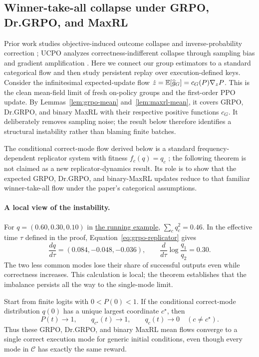 \subsection{Winner-take-all collapse under GRPO, Dr.GRPO, and MaxRL}
\label{app:theory-collapse}

Prior work studies objective-induced outcome collapse and inverse-probability
correction \citep{sinha2026expected}; UCPO analyzes correctness-indifferent collapse
through sampling bias and gradient amplification \citep[Section~4]{lochab2026ucpo}.
Here we connect our group estimators to a standard categorical flow and then study
persistent replay over execution-defined keys.
Consider the infinitesimal expected-update flow
$\dot z=\mathbb E[\widehat g_G]=c_G(P)\nabla_zP$. This is the clean mean-field limit
of fresh on-policy groups and the first-order PPO update. By Lemmas~\ref{lem:grpo-mean} and~\ref{lem:maxrl-mean}, it covers GRPO, Dr.GRPO, and binary MaxRL with their respective positive functions $c_G$. It deliberately
removes sampling noise; the result below therefore identifies a structural
instability rather than blaming finite batches.

The conditional correct-mode flow derived below is a standard
frequency-dependent replicator system with fitness $f_c(q)=q_c$
\citep{hofbauer1998evolutionary}; the following
theorem is not claimed as a new replicator-dynamics result. Its role is to show
that the expected GRPO, Dr.GRPO, and binary-MaxRL updates reduce to that
familiar winner-take-all flow under the paper's categorical assumptions.

\paragraph{A local view of the instability.}
For $q=(0.60,0.30,0.10)$ in \hyperref[ex:theory-running]{the running example},
$\sum_cq_c^2=0.46$. In the effective time $\tau$ defined in the proof,
Equation~\eqref{eq:grpo-replicator} gives
\[
 \frac{dq}{d\tau}=(0.084,-0.048,-0.036),\qquad
 \frac{d}{d\tau}\log\frac{q_1}{q_2}=0.30.
\]
The two less common modes lose their share of successful outputs even while
correctness increases. This calculation is local; the theorem establishes
that the imbalance persists all the way to the single-mode limit.

\begin{theorem}
\label{thm:grpo-collapse}
Start from finite logits with $0<P(0)<1$. If the conditional correct-mode
distribution $q(0)$ has a unique largest coordinate $c^\star$, then
\[
  P(t)\longrightarrow1,
  \qquad
  q_{c^\star}(t)\longrightarrow1,
  \qquad
  q_c(t)\longrightarrow0\quad(c\ne c^\star).
\]
Thus these GRPO, Dr.GRPO, and binary MaxRL mean flows converge to a single
correct execution mode for generic initial conditions, even though every mode
in $\mathcal C$ has exactly the same reward.
\end{theorem}

